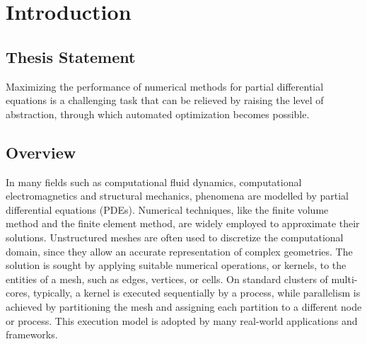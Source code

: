 \chapter{Introduction}

\section{Thesis Statement}




Maximizing the performance of numerical methods for partial differential equations is a challenging task that can be relieved by raising the level of abstraction, through which automated optimization becomes possible. 

\section{Overview}
In many fields such as computational fluid dynamics, computational electromagnetics and structural mechanics, phenomena are modelled by partial differential equations (PDEs). Numerical techniques, like the finite volume method and the finite element method, are widely employed to approximate their solutions. Unstructured meshes are often used to discretize the computational domain, since they allow an accurate representation of complex geometries. The solution is sought by applying suitable numerical operations, or kernels, to the entities of a mesh, such as edges, vertices, or cells. On standard clusters of multi-cores, typically, a kernel is executed sequentially by a process, while parallelism is achieved by partitioning the mesh and assigning each partition to a different node or process. This execution model is adopted by many real-world applications and frameworks.

